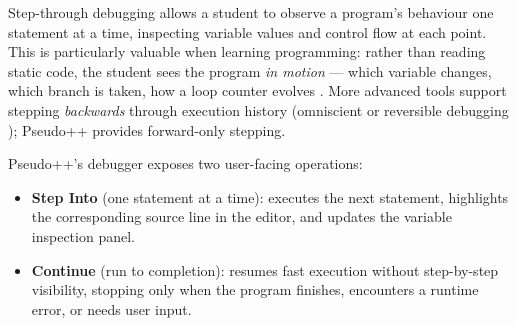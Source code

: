Step-through debugging allows a student to observe a program's behaviour one
statement at a time, inspecting variable values and control flow at each point.
This is particularly valuable when learning programming: rather than reading static
code, the student sees the program \textit{in motion} --- which variable changes,
which branch is taken, how a loop counter evolves \cite{wing2006ct}.
More advanced tools support stepping \emph{backwards} through execution history
(omniscient or reversible debugging \cite{lewis2003omniscient,reversible-debugging});
Pseudo++ provides forward-only stepping.

Pseudo++'s debugger exposes two user-facing operations:

\begin{itemize}
  \item \textbf{Step Into} (one statement at a time): executes the next statement,
        highlights the corresponding source line in the editor, and updates the
        variable inspection panel.
  \item \textbf{Continue} (run to completion): resumes fast execution without
        step-by-step visibility, stopping only when the program finishes, encounters
        a runtime error, or needs user input.
\end{itemize}

